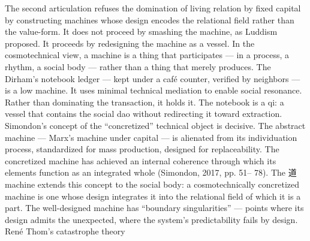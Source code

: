 The second articulation refuses the domination of living relation by fixed capital by constructing machines whose design encodes the relational field rather than the value-form. It does not proceed by smashing the machine, as Luddism proposed. It proceeds by redesigning the machine as a vessel. In the cosmotechnical view, a machine is a thing that participates — in a process, a rhythm, a social body — rather than a thing that merely produces. The Dirham’s notebook ledger — kept under a café counter, verified by neighbors — is a low machine. It uses minimal technical mediation to enable social resonance. Rather than dominating the transaction, it holds it. The notebook is a qi: a vessel that contains the social dao without redirecting it toward extraction. Simondon’s concept of the “concretized” technical object is decisive. The abstract machine — Marx’s machine under capital — is alienated from its individuation process, standardized for mass production, designed for replaceability. The concretized machine has achieved an internal coherence through which its elements function as an integrated whole (Simondon, 2017, pp. 51– 78). The 道 machine extends this concept to the social body: a cosmotechnically concretized machine is one whose design integrates it into the relational field of which it is a part. The well-designed machine has “boundary singularities” — points where its design admits the unexpected, where the system’s predictability fails by design. René Thom’s catastrophe theory

